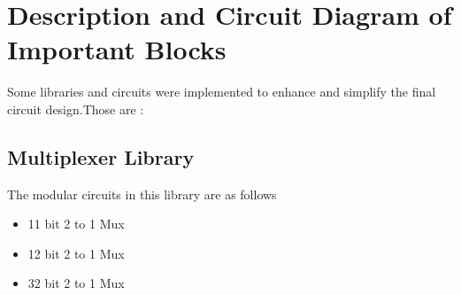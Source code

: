 \documentclass[12pt]{article}
\begin{document}
\newpage

\section{\large{Description and Circuit Diagram of Important Blocks}}
Some libraries and circuits were implemented to enhance and simplify the final circuit design.Those are :

\subsection{Multiplexer Library}
The modular circuits in this library are as follows 
\begin{itemize}

    \item 11 bit 2 to 1 Mux 
    \item 12 bit 2 to 1 Mux 
    \item 32 bit 2 to 1 Mux 

\end{itemize}
\end{document}
